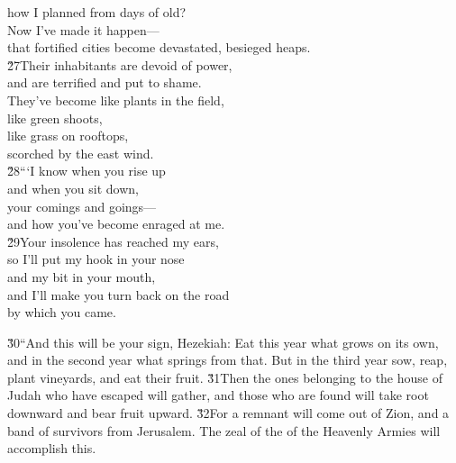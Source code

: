 \begin{poetry}
\poemlll       how I planned from days of old? \\
\poeml Now I've made it happen--- \\
\poemll    that fortified cities become devastated, besieged heaps. \\
\poeml \v{27}Their inhabitants are devoid of power, \\
\poemll    and are terrified and put to shame. \\
\poeml They've become like plants in the field, \\
\poemll    like green shoots, \\
\poeml like grass on rooftops, \\
\poemll    scorched by the east wind. \\
\poeml \v{28}```I know when you rise up \\
\poemll    and when you sit down, \\
\poeml your comings and goings--- \\
\poemll    and how you've become enraged at me. \\
\poeml \v{29}Your insolence has reached my ears, \\
\poemll    so I'll put my hook in your nose \\
\poemlll       and my bit in your mouth, \\
\poeml and I'll make you turn back on the road \\
\poemll    by which you came.
\end{poetry}

\v{30}``And this will be your sign, Hezekiah: Eat this year what grows on its own, and in the second year what springs from that. But in the third year sow, reap, plant vineyards, and eat their fruit. \v{31}Then the ones belonging to the house of Judah who have escaped will gather, and those who are found will take root downward and bear fruit upward. \v{32}For a remnant will come out of Zion, and a band of survivors from Jerusalem. The zeal of the  of the Heavenly Armies will accomplish this.

